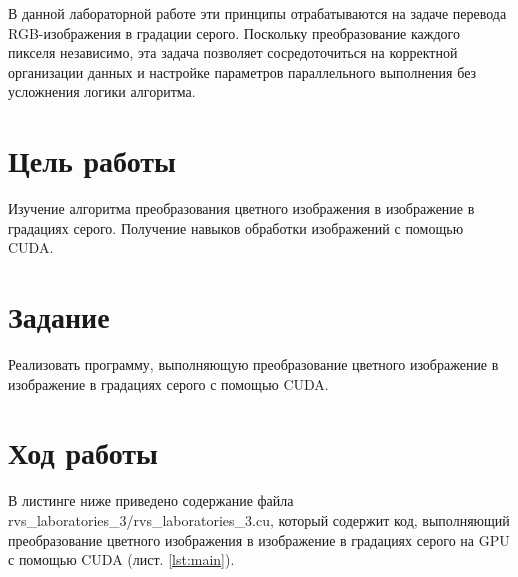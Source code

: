\documentclass[14pt]{extarticle}
\makeatletter
\newcommand{\numbersections}{\renewcommand{\Hy@numberline}[1]{##1~}}
\let\oldsection\section
\renewcommand{\section}{\numbersections\oldsection}
\makeatother
\begin{document}
В данной лабораторной работе эти принципы отрабатываются на задаче перевода RGB-изображения в градации серого. Поскольку преобразование каждого пикселя независимо, эта задача позволяет сосредоточиться на корректной организации данных и настройке параметров параллельного выполнения без усложнения логики алгоритма.

\section{Цель работы}

Изучение алгоритма преобразования цветного изображения в изображение в градациях серого. Получение навыков обработки изображений с помощью CUDA.

\section{Задание}

Реализовать программу, выполняющую преобразование цветного изображение в изображение в градациях серого с помощью CUDA.

\section{Ход работы}

В листинге ниже приведено содержание файла rvs\_laboratories\_3/rvs\_\-la\-bo\-ra\-tories\_\-3.cu, который содержит код, выполняющий преобразование цветного изображения в изображение в градациях серого на GPU с помощью CUDA (лист. \ref{lst:main}).
\end{document}
